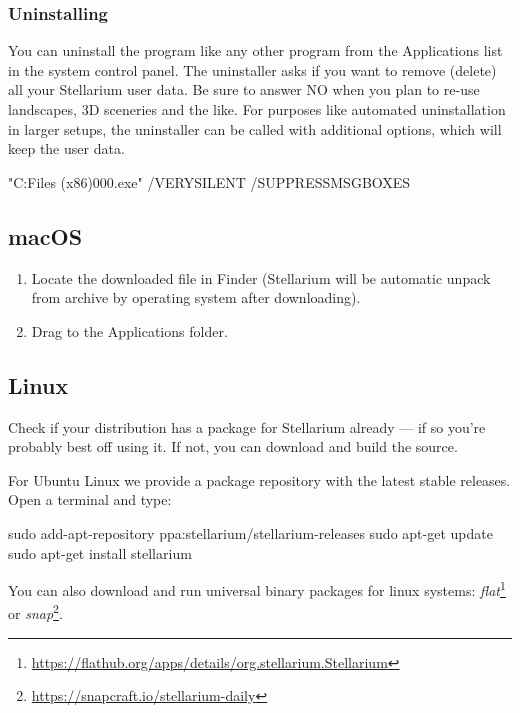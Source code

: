 \subsubsection{Uninstalling}
You can uninstall the program like any other program from the Applications list in the system control panel. 
The uninstaller asks if you want to remove (delete) all your Stellarium user data. Be sure to answer NO when you plan to re-use landscapes, 3D sceneries and the like. 
For purposes like automated uninstallation in larger setups, the uninstaller can be called with additional options, which will keep the user data.
\begin{commands}
"C:\Program Files (x86)\Stellarium\unins000.exe" /VERYSILENT /SUPPRESSMSGBOXES
\end{commands}

\subsection{macOS}
\label{sec:GettingStarted:Installation:macOS}

\begin{enumerate}
\item Locate the downloaded  file in
  Finder (Stellarium will be automatic unpack from archive by operating system after downloading).
\item
  Drag  to the Applications folder.
\end{enumerate}

\subsection{Linux}
\label{sec:GettingStarted:Installation:Linux}

Check if your distribution has a package for Stellarium already --- if
so you're probably best off using it. If not, you can download and build
the source.

For Ubuntu Linux we provide a package repository with the latest stable
releases. Open a terminal and type:

\begin{commands}
sudo add-apt-repository ppa:stellarium/stellarium-releases
sudo apt-get update
sudo apt-get install stellarium
\end{commands}

You can also download and run universal binary packages for linux systems:  \emph{flat}\footnote{\url{https://flathub.org/apps/details/org.stellarium.Stellarium}} or \emph{snap}\footnote{\url{https://snapcraft.io/stellarium-daily}}.

